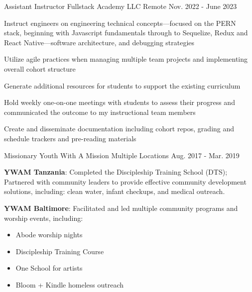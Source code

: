 \begin{cventries}
  \cventry
    {Assistant Instructor} %
    {Fullstack Academy LLC} %
    {Remote} %
    {Nov. 2022 - June 2023} %
    {
      \begin{cvitems} %
        \item {Instruct engineers on engineering technical concepts—focused on the PERN stack, beginning with Javascript fundamentals through to Sequelize, Redux and React Native—software architecture, and debugging strategies}
        \item {Utilize agile practices when managing multiple team projects and implementing overall cohort structure}
        \item {Generate additional resources for students to support the existing curriculum}
        \item {Hold weekly one-on-one meetings with students to assess their progress and communicated the outcome to my instructional team members}
        \item {Create and disseminate documentation including cohort repos, grading and schedule trackers and pre-reading materials}
      \end{cvitems}
    }

  \cventry
    {Missionary} %
    {Youth With A Mission} %
    {Multiple Locations} %
    {Aug. 2017 - Mar. 2019} %
    {
      \begin{cvitems} %
        \item {\textbf{YWAM Tanzania}: Completed the Discipleship Training School (DTS); Partnered with community leaders to provide effective community development solutions, including: clean water, infant checkups, and medical outreach.} 
        \item {\textbf{YWAM Baltimore}: Facilitated and led multiple community programs and worship events, including:}
        \begin{itemize}
          \item {Abode worship nights}
          \item {Discipleship Training Course}
          \item {One School for artists}
          \item {Bloom + Kindle homeless outreach}
        \end{itemize}
      \end{cvitems}
    }


\end{cventries}
